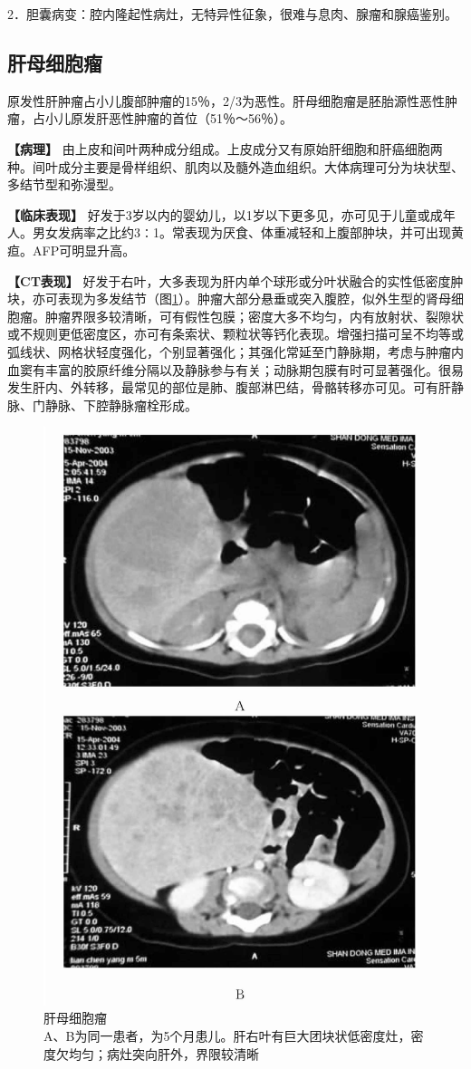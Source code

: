 2．胆囊病变：腔内隆起性病灶，无特异性征象，很难与息肉、腺瘤和腺癌鉴别。

\subsection{肝母细胞瘤}

原发性肝肿瘤占小儿腹部肿瘤的15％，2/3为恶性。肝母细胞瘤是胚胎源性恶性肿瘤，占小儿原发肝恶性肿瘤的首位（51％～56％）。

\textbf{【病理】}
由上皮和间叶两种成分组成。上皮成分又有原始肝细胞和肝癌细胞两种。间叶成分主要是骨样组织、肌肉以及髓外造血组织。大体病理可分为块状型、多结节型和弥漫型。

\textbf{【临床表现】}
好发于3岁以内的婴幼儿，以1岁以下更多见，亦可见于儿童或成年人。男女发病率之比约3∶1。常表现为厌食、体重减轻和上腹部肿块，并可出现黄疸。AFP可明显升高。

\textbf{【CT表现】}
好发于右叶，大多表现为肝内单个球形或分叶状融合的实性低密度肿块，亦可表现为多发结节（图\ref{fig11-5}）。肿瘤大部分悬垂或突入腹腔，似外生型的肾母细胞瘤。肿瘤界限多较清晰，可有假性包膜；密度大多不均匀，内有放射状、裂隙状或不规则更低密度区，亦可有条索状、颗粒状等钙化表现。增强扫描可呈不均等或弧线状、网格状轻度强化，个别显著强化；其强化常延至门静脉期，考虑与肿瘤内血窦有丰富的胶原纤维分隔以及静脉参与有关；动脉期包膜有时可显著强化。很易发生肝内、外转移，最常见的部位是肺、腹部淋巴结，骨骼转移亦可见。可有肝静脉、门静脉、下腔静脉瘤栓形成。

\begin{figure}[!htbp]
 \centering
 \includegraphics[width=.7\textwidth,height=\textheight,keepaspectratio]{./images/Image00276.jpg}
 \captionsetup{justification=centering}
 \caption{肝母细胞瘤\\{\small A、B为同一患者，为5个月患儿。肝右叶有巨大团块状低密度灶，密度欠均匀；病灶突向肝外，界限较清晰}}
 \label{fig11-5}
  \end{figure} 


